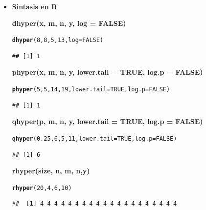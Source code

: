 \documentclass[12pt,letterpaper]{article}\usepackage[]{graphicx}\usepackage[]{color}
\makeatletter
\newcommand{\hlnum}[1]{\textcolor[rgb]{0.686,0.059,0.569}{#1}}%
\newcommand{\hlstd}[1]{\textcolor[rgb]{0.345,0.345,0.345}{#1}}%
\newcommand{\hlkwc}[1]{\textcolor[rgb]{0.333,0.667,0.333}{#1}}%
\newcommand{\hlkwd}[1]{\textcolor[rgb]{0.737,0.353,0.396}{\textbf{#1}}}%
\newenvironment{kframe}{%
 \def\at@end@of@kframe{}%
 \ifinner\ifhmode%
  \def\at@end@of@kframe{\end{minipage}}%
  \begin{minipage}{\columnwidth}%
 \fi\fi%
 \def\FrameCommand##1{\hskip\@totalleftmargin \hskip-\fboxsep
 \colorbox{shadecolor}{##1}\hskip-\fboxsep
     \hskip-\linewidth \hskip-\@totalleftmargin \hskip\columnwidth}%
 \MakeFramed {\advance\hsize-\width
   \@totalleftmargin\z@ \linewidth\hsize
   \@setminipage}}%
 {\par\unskip\endMakeFramed%
 \at@end@of@kframe}
\newenvironment{knitrout}{}{} %
\makeatother
\begin{document}
\begin{enumerate}
\begin{itemize}
\item \textbf{Sintasis en R}

\textbf{dhyper(x, m, n, y, log = FALSE)}
\begin{knitrout}
\color{fgcolor}\begin{kframe}
\begin{alltt}
\hlkwd{dhyper}\hlstd{(}\hlnum{8}\hlstd{,} \hlnum{8}\hlstd{,} \hlnum{5}\hlstd{,} \hlnum{13}\hlstd{,} \hlkwc{log} \hlstd{=} \hlnum{FALSE}\hlstd{)}
\end{alltt}
\begin{verbatim}
## [1] 1
\end{verbatim}
\end{kframe}
\end{knitrout}

\textbf{phyper(x, m, n, y, lower.tail = TRUE, log.p = FALSE)}
\begin{knitrout}
\color{fgcolor}\begin{kframe}
\begin{alltt}
\hlkwd{phyper}\hlstd{(}\hlnum{5}\hlstd{,} \hlnum{5}\hlstd{,} \hlnum{14}\hlstd{,} \hlnum{19}\hlstd{,} \hlkwc{lower.tail} \hlstd{=} \hlnum{TRUE}\hlstd{,} \hlkwc{log.p} \hlstd{=} \hlnum{FALSE}\hlstd{)}
\end{alltt}
\begin{verbatim}
## [1] 1
\end{verbatim}
\end{kframe}
\end{knitrout}

\textbf{qhyper(p, m, n, y, lower.tail = TRUE, log.p = FALSE)}
\begin{knitrout}
\color{fgcolor}\begin{kframe}
\begin{alltt}
\hlkwd{qhyper}\hlstd{(}\hlnum{0.25}\hlstd{,} \hlnum{6}\hlstd{,} \hlnum{5}\hlstd{,} \hlnum{11}\hlstd{,} \hlkwc{lower.tail} \hlstd{=} \hlnum{TRUE}\hlstd{,} \hlkwc{log.p} \hlstd{=} \hlnum{FALSE}\hlstd{)}
\end{alltt}
\begin{verbatim}
## [1] 6
\end{verbatim}
\end{kframe}
\end{knitrout}

\textbf{rhyper(size, n, m, n,y)}
\begin{knitrout}
\color{fgcolor}\begin{kframe}
\begin{alltt}
\hlkwd{rhyper}\hlstd{(}\hlnum{20}\hlstd{,} \hlnum{4}\hlstd{,} \hlnum{6}\hlstd{,} \hlnum{10}\hlstd{)}
\end{alltt}
\begin{verbatim}
##  [1] 4 4 4 4 4 4 4 4 4 4 4 4 4 4 4 4 4 4 4 4
\end{verbatim}
\end{kframe}
\end{knitrout}
\end{itemize}


\end{enumerate}
\end{document}
